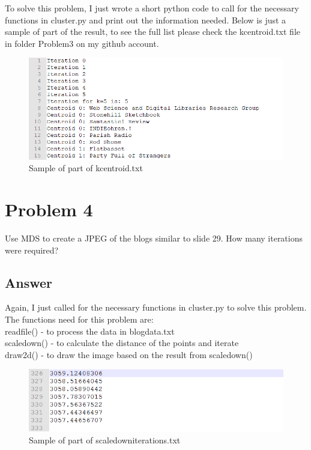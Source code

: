 \documentclass[12pt]{article}
\begin{document}
To solve this problem, I just wrote a short python code to call for the necessary functions in cluster.py and print out the information needed. Below is just a sample of part of the result, to see the full list please check the kcentroid.txt file in folder Problem3 on my github account. 

\begin{figure}[h]
\centering
\includegraphics[width=6.5in]{kcentroid.png}
\caption{Sample of part of kcentroid.txt}
\end{figure}
\pagebreak


\pagebreak

\section*{Problem 4}

Use MDS to create a JPEG of the blogs similar to slide 29.  
How many iterations were required?

\subsection*{Answer}

Again, I just called for the necessary functions in cluster.py to solve this problem. The functions need for this problem are:\\
readfile() - to process the data in blogdata.txt\\
scaledown() - to calculate the distance of the points and iterate\\
draw2d() - to draw the image based on the result from scaledown()

\begin{figure}[h]
\centering
\includegraphics[width=6.5in]{scaledowniterations.png}
\caption{Sample of part of scaledowniterations.txt}
\end{figure}
\end{document}
